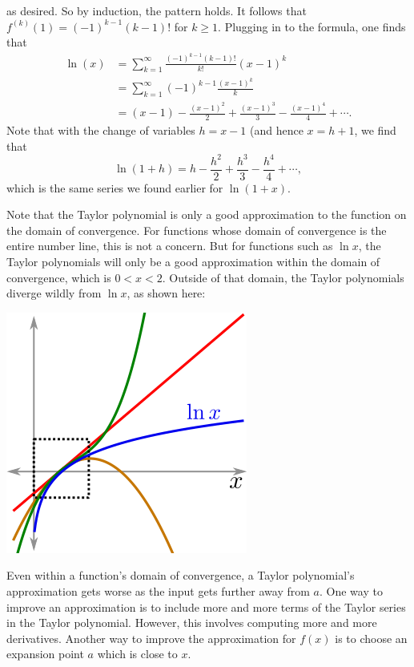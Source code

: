 \documentclass[twoside,openright,titlepage,a4paper]{book}
\begin{document}
\begin{sloppypar}
\begin{examplebox}
\begin{equation*}
\end{equation*}
as desired. So by induction, the pattern holds. It follows that $f^{\left(k\right)}(1) = (-1)^{k-1}(k-1)!$ for $k \geq 1$. Plugging in to the formula, one finds that
\begin{align*} 
\ln(x) &= \sum_{k=1}^\infty \frac{(-1)^{k-1}(k-1)!}{k!}(x-1)^k \\
&= \sum_{k=1}^\infty (-1)^{k-1} \frac{(x-1)^k}{k} \\
&= (x-1) - \frac{(x-1)^2}{2} + \frac{(x-1)^3}{3} - \frac{(x-1)^4}{4}+\dotsb.
\end{align*}
Note that with the change of variables $h = x-1$ (and hence $x = h+1$, we find that \[ \ln(1+h) = h - \frac{h^2}{2} + \frac{h^3}{3} - \frac{h^4}{4} + \dotsb, \] which is the same series we found earlier for  $\ln(1+x)$.
\end{examplebox}
Note that the Taylor polynomial is only a good approximation to the function on the domain of convergence. For functions whose domain of convergence is the entire number line, this is not a concern. But for functions such as $\ln x$, the Taylor polynomials will only be a good approximation within the domain of convergence, which is $0 < x < 2$. Outside of that domain, the Taylor polynomials diverge wildly from $\ln x$, as shown here:
\begin{center}\includegraphics[scale=0.6]{NaturalLogApproximation}\end{center}
Even within a function's domain of convergence, a Taylor polynomial's approximation gets worse as the input gets further away from $a$. One way to improve an approximation is to include more and more terms of the Taylor series in the Taylor polynomial. However, this involves computing more and more derivatives. Another way to improve the approximation for $f(x)$ is to choose an expansion point $a$ which is close to $x$.\\

\end{sloppypar}
\end{document}
